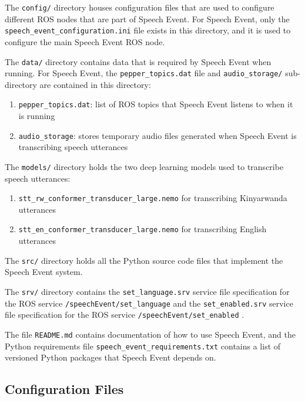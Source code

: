 \documentclass{CSSRforAfrica}
\begin{document}
The \texttt{config/} directory houses configuration files that are used to configure different ROS nodes that are part of Speech Event. For Speech Event, only the \texttt{speech\_event\_configuration.ini} file exists in this directory, and it is used to configure the main Speech Event ROS node.

The \texttt{data/} directory contains data that is required by Speech Event when running. For Speech Event, the \texttt{pepper\_topics.dat} file and \texttt{audio\_storage/} sub-directory are contained in this directory:

\begin{enumerate}
    \item \texttt{pepper\_topics.dat}: list of ROS topics that Speech Event listens to when it is running
    \item \texttt{audio\_storage}: stores temporary audio files generated when Speech Event is transcribing speech utterances
\end{enumerate}

The \texttt{models/} directory holds the two deep learning models used to transcribe speech utterances:

\begin{enumerate}
    \item \texttt{stt\_rw\_conformer\_transducer\_large.nemo} for transcribing Kinyarwanda utterances
    \item \texttt{stt\_en\_conformer\_transducer\_large.nemo} for transcribing English utterances
\end{enumerate}

The \texttt{src/} directory holds all the Python source code files that implement the Speech Event system.

The \texttt{srv/} directory contains the \texttt{set\_language.srv} service file specification for the ROS service \texttt{/speechEvent/set\_language} and the \texttt{set\_enabled.srv} service file specification for the ROS service \texttt{/speechEvent/set\_enabled} .

The file \texttt{README.md} contains documentation of how to use Speech Event,  and the Python requirements file \texttt{speech\_event\_requirements.txt} contains a list of versioned Python packages that Speech Event depends on.

\subsection{Configuration Files}
\end{document}
